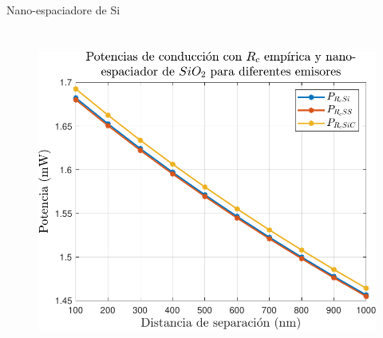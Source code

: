 \documentclass[spanish,a4paper]{beamer}%
\begin{document}
\begin{frame}{Nano-espaciadore de Si}
{\begin{columns}
\begin{figure}[h]
										\includegraphics[width=\columnwidth]{Prc_XxSiO2Ge}%
								\label{fig:Prc_XxSiO2Ge}%
						\end{figure}
						\vfill
				\end{columns}							
		}
		
\end{frame}
\end{document}
